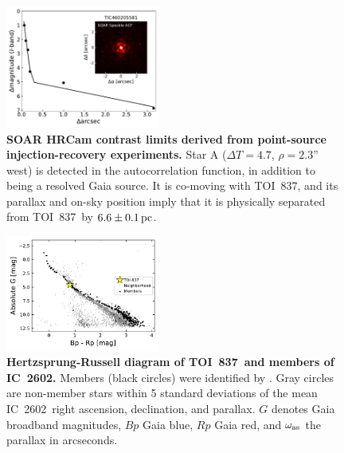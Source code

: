 \documentclass[12pt,twocolumn,tighten]{aastex62}
\newcommand{\tn}{TOI~837} %
\newcommand{\cn}{IC~2602} %
\begin{document}
\begin{figure}[t]
	\begin{center}
		\leavevmode
		\includegraphics[width=0.45\textwidth]{f6.pdf}
	\end{center}
	\vspace{-0.7cm}
	\caption{ 
		{\bf SOAR HRCam contrast limits derived from point-source
			injection-recovery experiments.} 
		Star A ($\Delta T=4.7$, $\rho=2.3$'' west) is detected in the
		autocorrelation function, in addition to being a resolved Gaia
		source.
		It is co-moving with \tn, and
		its parallax and on-sky position imply that
		it is physically separated from \tn\ by $6.6\pm 0.1\,{\rm pc}$.
		\label{fig:soar}
	}
\end{figure}

\begin{figure}[t!]
	\begin{center}
		\leavevmode
		\includegraphics[width=0.45\textwidth]{f7.pdf}
	\end{center}
	\vspace{-0.7cm}
	\caption{ 
  {\bf Hertzsprung-Russell diagram of \tn\ and members of \cn.}
  Members (black circles) were identified by
  \citet{cantatgaudin_gaia_2018}.  Gray circles are non-member stars
  within 5 standard deviations of the mean \cn\ right ascension,
  declination, and parallax.  $G$ denotes Gaia broadband magnitudes,
  $Bp$ Gaia blue, $Rp$ Gaia red, and $\omega_{\rm as}$ the parallax in
  arcseconds. 
  \label{fig:hr}
	}
\end{figure}
\end{document}
